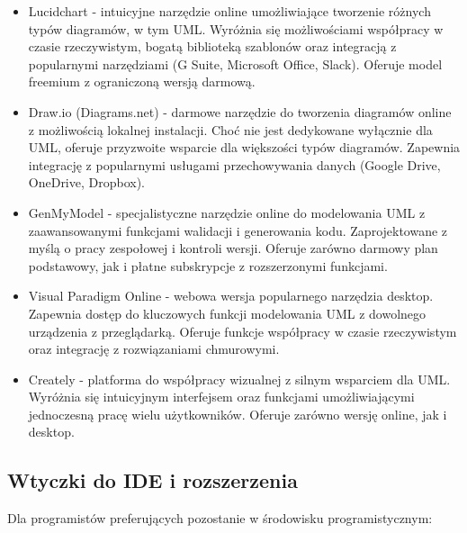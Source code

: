 \documentclass[12pt,a4paper]{article}
\begin{document}
\begin{itemize}
    \item Lucidchart - intuicyjne narzędzie online umożliwiające tworzenie różnych typów diagramów, w tym UML. Wyróżnia się możliwościami współpracy w czasie rzeczywistym, bogatą biblioteką szablonów oraz integracją z popularnymi narzędziami (G Suite, Microsoft Office, Slack). Oferuje model freemium z ograniczoną wersją darmową.
    
    \item Draw.io (Diagrams.net) - darmowe narzędzie do tworzenia diagramów online z możliwością lokalnej instalacji. Choć nie jest dedykowane wyłącznie dla UML, oferuje przyzwoite wsparcie dla większości typów diagramów. Zapewnia integrację z popularnymi usługami przechowywania danych (Google Drive, OneDrive, Dropbox).
    
    \item GenMyModel - specjalistyczne narzędzie online do modelowania UML z zaawansowanymi funkcjami walidacji i generowania kodu. Zaprojektowane z myślą o pracy zespołowej i kontroli wersji. Oferuje zarówno darmowy plan podstawowy, jak i płatne subskrypcje z rozszerzonymi funkcjami.
    
    \item Visual Paradigm Online - webowa wersja popularnego narzędzia desktop. Zapewnia dostęp do kluczowych funkcji modelowania UML z dowolnego urządzenia z przeglądarką. Oferuje funkcje współpracy w czasie rzeczywistym oraz integrację z rozwiązaniami chmurowymi.
    
    \item Creately - platforma do współpracy wizualnej z silnym wsparciem dla UML. Wyróżnia się intuicyjnym interfejsem oraz funkcjami umożliwiającymi jednoczesną pracę wielu użytkowników. Oferuje zarówno wersję online, jak i desktop.
\end{itemize}

\subsection{Wtyczki do IDE i rozszerzenia}
Dla programistów preferujących pozostanie w środowisku programistycznym:
\end{document}
